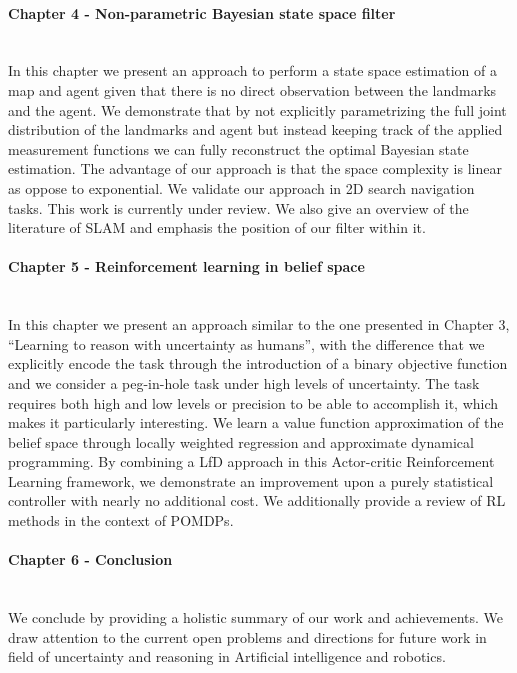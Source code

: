 \begin{minipage}[c]{0.9\textwidth}
\paragraph{Chapter 4 - Non-parametric Bayesian state space filter}\\
In this chapter we present an approach to perform a state space estimation of a map and agent 
given that there is no direct observation between the landmarks and the agent. We demonstrate that 
by not explicitly parametrizing the full joint distribution of the landmarks and agent but instead
keeping track of the applied measurement functions we can fully reconstruct the optimal Bayesian 
state estimation. The advantage of our approach is that the space complexity is linear as oppose 
to exponential. We validate our approach in 2D search navigation tasks. This work is currently under review.
We also give an overview of the literature of SLAM and emphasis the position of our filter within it.
\end{minipage}

\begin{minipage}[c]{0.9\textwidth}
\paragraph{Chapter 5 - Reinforcement learning in belief space}\\
In this chapter we present an approach similar to the one presented in Chapter 3, ``Learning to reason with uncertainty as humans'', with the difference that
we explicitly encode the task through the introduction of a binary objective function and we consider a peg-in-hole
task under high levels of uncertainty. The task requires both high and low levels or precision to be able to accomplish it,
which makes it particularly interesting. We learn a value function approximation of the belief space through locally weighted 
regression and approximate dynamical programming.
By combining a LfD approach in this Actor-critic Reinforcement Learning framework, we demonstrate an improvement upon 
a purely statistical controller with nearly no additional cost. 
We additionally provide a review of RL methods in the context of POMDPs.
\end{minipage}

\begin{minipage}[c]{0.9\textwidth}
\paragraph{Chapter 6 - Conclusion}\\
We conclude by providing a holistic summary of our work and achievements. We draw attention to the current 
open problems and directions for future work in field of uncertainty and reasoning in Artificial intelligence and robotics.
\end{minipage}







